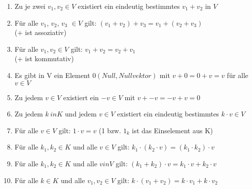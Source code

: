\documentclass{scrartcl}
\begin{document}
		\begin{enumerate}
			\item Zu je zwei $v_1, v_2 \in V$ existiert ein eindeutig bestimmtes $v_1+v_2$   in $V$
			
			\item Für alle $v_1$, $v_2$, $v_3$ $\in V$ gilt: $(v_1 + v_2) +v_3 = v_1 + (v_2 + v_3)$ \\ (+ ist assoziativ)
			
			\item Für alle $v_1, v_2 \in V$ gilt: $v_1+v_2 = v_2+v_1$
			\\ (+ ist kommutativ)
			
			\item Es gibt in V ein Element $0 (Null, Nullvektor)$ mit $v+0=0+v=v$ für alle $v \in V$
			
			\item Zu jedem $v \in V$ existiert ein $-v \in V$ mit $v+-v = -v+v=0$
			
			\item Zu jedem $k \ in K$ und jedem $v \in V$ existiert ein eindeutig bestimmtes $k \cdot v \in V$
			
			\item Für alle $v \in V$ gilt: $1 \cdot v = v$ (1 bzw. $1_k$ ist das Einselement aus K)
			
			\item Für alle $k_1 , k_2 \in K$ und alle $v \in V$ gilt: $k_1 \cdot (k_2 \cdot v)=(k_1 \cdot
			 k_2) \cdot v$
			 
			 \item Für alle $k_1 , k_2 \in K$ und alle $v in V$ gilt: $(k_1 + k_2) \cdot v = k_1\cdot v + k_2 \cdot v$ 
			 
			 \item Für alle $k \in K$ und alle $v_1 , v_2 \in V$ gilt: $k \cdot (v_1 + v_2) = k \cdot v_1 + k \cdot v_2$
			  
			
			
		\end{enumerate}
		
\end{document}
